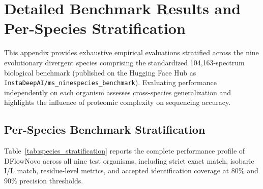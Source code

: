 \chapter{Detailed Benchmark Results and Per-Species Stratification}

This appendix provides exhaustive empirical evaluations stratified across the nine evolutionary divergent species comprising the standardized 104,163-spectrum biological benchmark \citep{Tran2017} (published on the Hugging Face Hub as \texttt{InstaDeepAI/ms\_ninespecies\_benchmark}). Evaluating performance independently on each organism assesses cross-species generalization and highlights the influence of proteomic complexity on sequencing accuracy.

\section{Per-Species Benchmark Stratification}

Table~\ref{tab:species_stratification} reports the complete performance profile of DFlowNovo across all nine test organisms, including strict exact match, isobaric I/L match, residue-level metrics, and accepted identification coverage at 80\% and 90\% precision thresholds.

